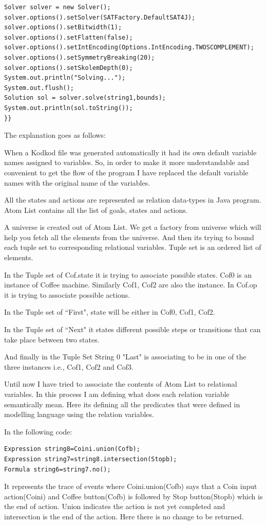\documentclass[a4paper,12pt]{report}
\begin{document}
\begin{onehalfspacing}
\begin{verbatim}
Solver solver = new Solver();
solver.options().setSolver(SATFactory.DefaultSAT4J);
solver.options().setBitwidth(1);
solver.options().setFlatten(false);
solver.options().setIntEncoding(Options.IntEncoding.TWOSCOMPLEMENT);
solver.options().setSymmetryBreaking(20);
solver.options().setSkolemDepth(0);
System.out.println("Solving...");
System.out.flush();
Solution sol = solver.solve(string1,bounds);
System.out.println(sol.toString());
}}

\end{verbatim}
The explanation goes as follows:

When a Kodkod file was generated automatically it had its own default variable names assigned to variables. So, in order to make it more understandable and convenient to get the flow of the program I have replaced the default variable names with the original name of the variables.

All the states and actions are represented as relation data-types in Java program. Atom List contains all the list of goals, states and actions. 

A universe is created out of Atom List. We get a factory from universe which will help you fetch all the elements from the universe. And then its trying to  bound each tuple set to corresponding relational variables. Tuple set is an ordered list of elements. 

In the Tuple set of Cof.state it is trying to associate possible states. Cof0 is an instance of Coffee machine. Similarly Cof1, Cof2 are also the instance. In Cof.op it is trying to associate possible actions.

In the Tuple set of ``First", state will be either in Cof0, Cof1, Cof2. 
 
In the Tuple set of ``Next" it states different possible steps or transitions that can take place between two states.  

And finally in the Tuple Set String 0 "Last" is associating to be in one of the three instances i.e., Cof1, Cof2 and Cof3.

Until now I have tried to associate the contents of Atom List to relational variables. In this process I am defining what does each relation variable semantically mean. Here its defining all the predicates that were defined in modelling language using the relation variables. 

In the following code:

\begin{verbatim}
Expression string8=Coini.union(Cofb);
Expression string7=string8.intersection(Stopb);
Formula string6=string7.no();
\end{verbatim}
It represents the trace of events where Coini.union(Cofb) says that a Coin input action(Coini) and Coffee button(Cofb) is followed by Stop button(Stopb) which is the end of action. Union indicates the action is not yet completed and intersection is the end of the action. Here there is no change to be returned.


\end{onehalfspacing}
\end{document}
